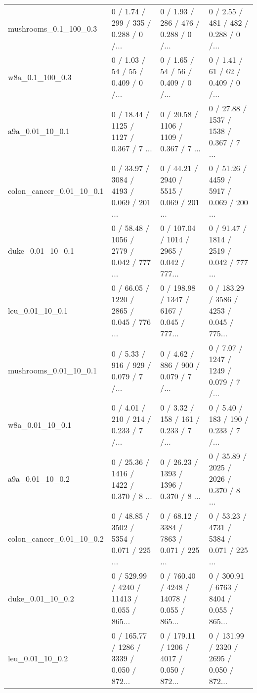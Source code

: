 \begin{tabular}{llll}
     mushrooms\_0.1\_100\_0.3 &  0 / 1.74 /    299 /     335 / 0.288 /      0 /... &  0 / 1.93 /    286 /     476 / 0.288 /      0 /... &  0 / 2.55 /    481 /     482 / 0.288 /      0 /... \\
           w8a\_0.1\_100\_0.3 &  0 / 1.03 /     54 /      55 / 0.409 /      0 /... &  0 / 1.65 /     54 /      56 / 0.409 /      0 /... &  0 / 1.41 /     61 /      62 / 0.409 /      0 /... \\
           a9a\_0.01\_10\_0.1 &  0 / 18.44 /   1125 /    1127 / 0.367 /      7 ... &  0 / 20.58 /   1106 /    1109 / 0.367 /      7 ... &  0 / 27.88 /   1537 /    1538 / 0.367 /      7 ... \\
  colon\_cancer\_0.01\_10\_0.1 &  0 / 33.97 /   3084 /    4193 / 0.069 /    201 ... &  0 / 44.21 /   2940 /    5515 / 0.069 /    201 ... &  0 / 51.26 /   4459 /    5917 / 0.069 /    200 ... \\
          duke\_0.01\_10\_0.1 &  0 / 58.48 /   1056 /    2779 / 0.042 /    777 ... &  0 / 107.04 /   1014 /    2965 / 0.042 /    777... &  0 / 91.47 /   1814 /    2519 / 0.042 /    777 ... \\
           leu\_0.01\_10\_0.1 &  0 / 66.05 /   1220 /    2865 / 0.045 /    776 ... &  0 / 198.98 /   1347 /    6167 / 0.045 /    777... &  0 / 183.29 /   3586 /    4253 / 0.045 /    775... \\
     mushrooms\_0.01\_10\_0.1 &  0 / 5.33 /    916 /     929 / 0.079 /      7 /... &  0 / 4.62 /    886 /     900 / 0.079 /      7 /... &  0 / 7.07 /   1247 /    1249 / 0.079 /      7 /... \\
           w8a\_0.01\_10\_0.1 &  0 / 4.01 /    210 /     214 / 0.233 /      7 /... &  0 / 3.32 /    158 /     161 / 0.233 /      7 /... &  0 / 5.40 /    183 /     190 / 0.233 /      7 /... \\
           a9a\_0.01\_10\_0.2 &  0 / 25.36 /   1416 /    1422 / 0.370 /      8 ... &  0 / 26.23 /   1393 /    1396 / 0.370 /      8 ... &  0 / 35.89 /   2025 /    2026 / 0.370 /      8 ... \\
  colon\_cancer\_0.01\_10\_0.2 &  0 / 48.85 /   3502 /    5354 / 0.071 /    225 ... &  0 / 68.12 /   3384 /    7863 / 0.071 /    225 ... &  0 / 53.23 /   4731 /    5384 / 0.071 /    225 ... \\
          duke\_0.01\_10\_0.2 &  0 / 529.99 /   4240 /   11413 / 0.055 /    865... &  0 / 760.40 /   4248 /   14078 / 0.055 /    865... &  0 / 300.91 /   6763 /    8404 / 0.055 /    865... \\
           leu\_0.01\_10\_0.2 &  0 / 165.77 /   1286 /    3339 / 0.050 /    872... &  0 / 179.11 /   1206 /    4017 / 0.050 /    872... &  0 / 131.99 /   2320 /    2695 / 0.050 /    872... \\

\end{tabular}
